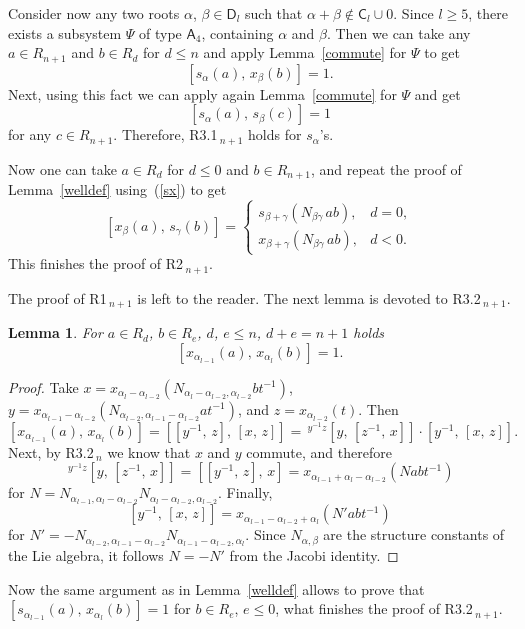 \documentclass[oneside, 8pt]{amsart}
\newtheorem{lemma}{Lemma}
\theoremstyle{remark}
\theoremstyle{definition}
\newcommand{\inv}{^{-1}}
\newcommand{\rA}{\mathsf{A}}
\newcommand{\rC}{\mathsf{C}}
\newcommand{\rD}{\mathsf{D}}
\numberwithin{equation}{section}
\begin{document}
Consider now any two roots $\alpha$, $\beta\in\rD_l$ such that $\alpha+\beta\not\in\rC_l\cup0$. Since $l\geq5$, there exists a subsystem $\Psi$ of type $\rA_4$, containing $\alpha$ and $\beta$. Then we can take any $a\in R_{n+1}$ and $b\in R_d$ for $d\leq n$ and apply Lemma~\ref{commute} for $\Psi$ to get
\begin{equation} \label{sx} [s_\alpha(a),\,x_\beta(b)]=1. \end{equation}
Next, using this fact we can apply again Lemma~\ref{commute} for $\Psi$ and get
\[ [s_\alpha(a),\,s_\beta(c)]=1 \]
for any $c\in R_{n+1}$. Therefore, R3.1$\!\,_{n+1}$ holds for $s_\alpha$'s.

Now one can take $a\in R_d$ for $d\leq0$ and $b\in R_{n+1}$, and repeat the proof of Lemma~\ref{welldef} using~(\ref{sx}) to get
\[ [x_\beta(a),\,s_\gamma(b)]=\begin{cases}s_{\beta+\gamma}(N_{\beta\gamma}\,ab),&d=0,\\x_{\beta+\gamma}(N_{\beta\gamma}\,ab),&d<0.\end{cases} \]
This finishes the proof of R2$\!\,_{n+1}$.

The proof of R1$\!\,_{n+1}$ is left to the reader. The next lemma is devoted to R3.2$\!\,_{n+1}$.

\begin{lemma}
For $a\in R_d$, $b\in R_e$, $d$, $e\leq n$, $d+e=n+1$ holds
\[ [x_{\alpha_{l-1}}(a),\,x_{\alpha_l}(b)]=1. \]
\end{lemma}
\begin{proof}
Take $x=x_{\alpha_{l}-\alpha_{l-2}}(N_{\alpha_{l}-\alpha_{l-2},\alpha_{l-2}}bt\inv)$, $y=x_{\alpha_{l-1}-\alpha_{l-2}}(N_{\alpha_{l-2},\alpha_{l-1}-\alpha_{l-2}}at\inv)$, and $z=x_{\alpha_{l-2}}(t)$. Then
\[ [x_{\alpha_{l-1}}(a),\,x_{\alpha_l}(b)]=[[y\inv,\,z],\,[x,\,z]]=\,^{y\inv z}[y,\,[z\inv,\,x]]\cdot[y\inv,\,[x,\,z]]. \]
Next, by R3.2$\!\,_n$ we know that $x$ and $y$ commute, and therefore 
\[ \,^{y\inv z}[y,\,[z\inv,\,x]]=[[y\inv,\,z],\,x]=x_{\alpha_{l-1}+\alpha_{l}-\alpha_{l-2}}(Nabt\inv) \]
for $N=N_{\alpha_{l-1},\alpha_{l}-\alpha_{l-2}}N_{\alpha_{l}-\alpha_{l-2},\alpha_{l-2}}$. Finally,
\[ [y\inv,\,[x,\,z]]=x_{\alpha_{l-1}-\alpha_{l-2}+\alpha_l}(N'abt\inv) \]
for $N'=-N_{\alpha_{l-2},\alpha_{l-1}-\alpha_{l-2}}N_{{\alpha_{l-1}-\alpha_{l-2}},\alpha_l}$. Since $N_{\alpha,\beta}$ are the structure constants of the Lie algebra, it follows $N=-N'$ from the Jacobi identity.
\end{proof}

Now the same argument as in Lemma~\ref{welldef} allows to prove that $[s_{\alpha_{l-1}}(a),\,x_{\alpha_l}(b)]=1$ for $b\in R_e$, $e\leq0$, what finishes the proof of R3.2$\!\,_{n+1}$.
\end{document}
